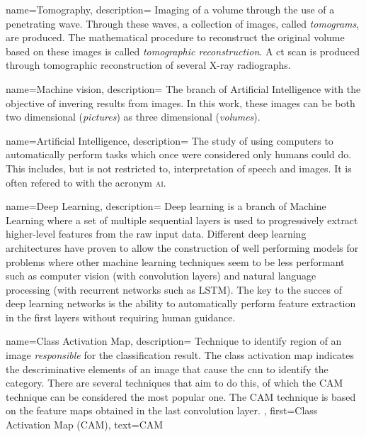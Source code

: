 {
        name={Tomography},
        description={
                Imaging of a volume through the use of a penetrating wave. 
                Through these waves, a collection of images, called \textit{tomograms}, are produced.
                The mathematical procedure to reconstruct the original volume based on these images is called \textit{tomographic reconstruction}.
                A \acrfull{ct} scan is produced through tomographic reconstruction of several X-ray radiographs.
                }
}

{
        name={Machine vision},
        description={
                The branch of Artificial Intelligence with the objective of invering results from images. 
                In this work, these images can be both two dimensional (\textit{pictures}) as three dimensional (\textit{volumes}).
                }
}

{
        name={Artificial Intelligence},
        description={
                The study of using computers to automatically perform tasks which once were considered only humans could do.
                This includes, but is not restricted to, interpretation of speech and images. It is often refered to with the acronym \textsc{ai}.
                }
}

{
        name={Deep Learning},
        description={
                Deep learning is a branch of Machine Learning where a set of multiple sequential layers is used to progressively extract higher-level features from the raw input data.
                Different deep learning architectures have proven to allow the construction of well performing models for problems where other machine learning techniques seem to be less performant such as
                computer vision (with convolution layers) and natural language processing (with recurrent networks such as LSTM). 
                The key to the succes of deep learning networks is the ability to automatically perform feature extraction in the first layers without requiring human guidance.
                }
}

{
        name={Class Activation Map},
        description={
                Technique to identify region of an image \textit{responsible} for the classification result.
                The class activation map indicates the descriminative elements of an image that cause the \acrshort{cnn} to identify the category.
                There are several techniques that aim to do this, of which the CAM technique can be considered the most popular one.
                The CAM technique is based on the feature maps obtained in the last convolution layer.
        },
        first={Class Activation Map (CAM)},
        text={CAM}
}



